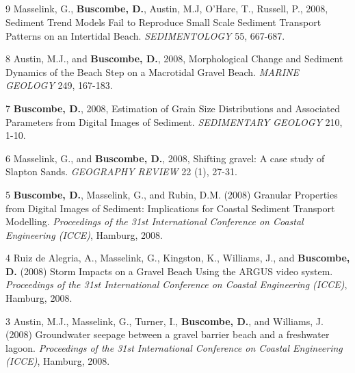 \documentclass[margin,line]{resume}
\begin{document}
\begin{resume}
\begin{footnotesize}
	\subsection{}
	\begin{list1}
	\item[9] Masselink, G., {\bf Buscombe, D.}, Austin, M.J, O'Hare, T., Russell, P., 2008, Sediment Trend Models Fail to Reproduce Small Scale Sediment Transport Patterns on an Intertidal Beach. {\sl SEDIMENTOLOGY} 55, 667-687.\\
	
	\item[8] Austin, M.J., and {\bf Buscombe, D.}, 2008, Morphological Change and Sediment Dynamics of the Beach Step on a Macrotidal Gravel Beach. {\sl MARINE GEOLOGY} 249, 167-183. \\
	
	\item[7] {\bf Buscombe, D.}, 2008, Estimation of Grain Size Distributions and Associated Parameters from Digital Images of Sediment. {\sl SEDIMENTARY GEOLOGY}  210, 1-10.\\

	\item[6] Masselink, G., and {\bf Buscombe, D.}, 2008, Shifting gravel: A case study of Slapton Sands. {\sl GEOGRAPHY REVIEW} 22 (1), 27-31.\\

	\item[5] {\bf Buscombe, D.}, Masselink, G., and Rubin, D.M. (2008) Granular Properties from Digital Images of Sediment: Implications for Coastal Sediment Transport Modelling. {\sl Proceedings of the 31st International Conference on Coastal Engineering (ICCE)}, Hamburg, 2008.\\
	
	\item[4] Ruiz de Alegria, A., Masselink, G., Kingston, K., Williams, J., and {\bf Buscombe, D.} (2008) Storm Impacts on a Gravel Beach Using the ARGUS video system. {\sl Proceedings of the 31st International Conference on Coastal Engineering (ICCE)}, Hamburg, 2008.\\
	
	\item[3] Austin, M.J., Masselink, G., Turner, I., {\bf Buscombe, D.}, and Williams, J. (2008) Groundwater seepage between a gravel barrier beach and a freshwater lagoon. {\sl Proceedings of the 31st International Conference on Coastal Engineering (ICCE)}, Hamburg, 2008.


\end{list1}
\end{footnotesize}
\end{resume}
\end{document}
